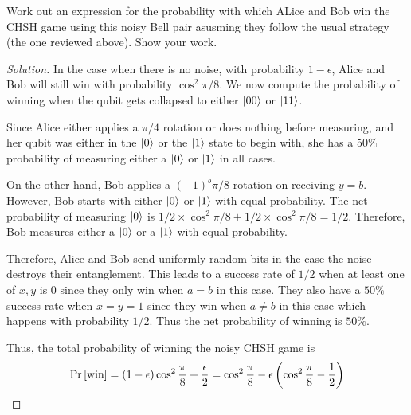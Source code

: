 \begin{solution}[label=ques:4a]
  \begin{question}
    Work out an expression for the probability with which ALice and Bob win the CHSH game using this noisy Bell pair asusming they follow the usual strategy (the one reviewed above). Show your work.
  \end{question}
  \tcblower{}
  \begin{proof}[Solution]
    In the case when there is no noise, with probability $1 - \epsilon$, Alice and Bob will still win with probability $\cos^2\pi/8$. We now compute the probability of winning when the qubit gets collapsed to either $\ket{00}$ or $\ket{11}$.\par
    Since Alice either applies a $\pi/4$ rotation or does nothing before measuring, and her qubit was either in the $\ket{0}$ or the $\ket{1}$ state to begin with, she has a $50\%$ probability of measuring either a $\ket{0}$ or $\ket{1}$ in all cases.\par
    On the other hand, Bob applies a $(-1)^b\pi/8$ rotation on receiving $y = b$. However, Bob starts with either $\ket{0}$ or $\ket{1}$ with equal probability. The net probability of measuring $\ket{0}$ is $1/2\times \cos^2\pi/8 + 1/2\times\cos^2\pi/8 = 1/2$. Therefore, Bob measures either a $\ket{0}$ or a $\ket{1}$ with equal probability.\par
    Therefore, Alice and Bob send uniformly random bits in the case the noise destroys their entanglement. This leads to a success rate of $1/2$ when at least one of $x, y$ is $0$ since they only win when $a = b$ in this case. They also have a $50\%$ success rate when $x = y = 1$ since they win when $a \neq b$ in this case which happens with probability $1/2$. Thus the net probability of winning is $50\%$.\par
    Thus, the total probability of winning the noisy CHSH game is
    \begin{equation}
      \Pr\left[ \text{win} \right] = (1 - \epsilon)\cos^2\frac{\pi}{8} + \frac{\epsilon}{2} = \cos^2\frac{\pi}{8} - \epsilon\left(\cos^2\frac{\pi}{8} - \frac{1}{2}\right)
      \label{eq:noisywin}
    \end{equation}
  \end{proof}
\end{solution}

